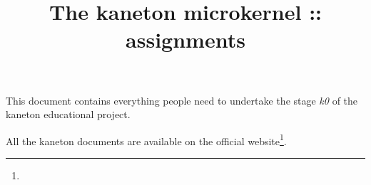 %
%
%
%
%
%

%
%

%
%

\def\path{../../..}

%
%



%
%


%
%

\title{The kaneton microkernel :: assignments \\
       \version
       \logo}

%
%



%
%

\maketitle

%
%

This document contains everything people need to undertake the stage \emph{k0}
of the kaneton educational project.

\-

All the kaneton documents are available on
  the official website\footnote{}.

%
%

\tableofcontents

%
%

\indentation{}

%
%






